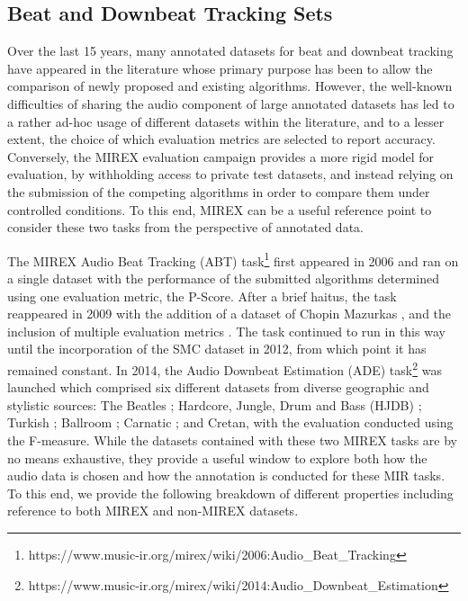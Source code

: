 \subsection{Beat and Downbeat Tracking Sets}

Over the last 15 years, many annotated datasets for beat and downbeat tracking have appeared in the literature whose primary purpose has been to allow the comparison of newly proposed and existing algorithms. However, the well-known difficulties of sharing the audio component of large annotated datasets has led to a rather ad-hoc usage of different datasets within the literature, and to a lesser extent, the choice of which evaluation metrics are selected to report accuracy. Conversely, the MIREX evaluation campaign provides a more rigid model for evaluation, by withholding access to private test datasets, and instead relying on the submission of the competing algorithms in order to compare them under controlled conditions. To this end, MIREX can be a useful reference point to consider these two tasks from the perspective of annotated data.  

The MIREX Audio Beat Tracking (ABT) task\footnote{https://www.music-ir.org/mirex/wiki/2006:Audio\_Beat\_Tracking} first appeared in 2006 and ran on a single dataset \cite{moelants04icmpc,mckinney07jnmr} with the performance of the submitted algorithms determined using one evaluation metric, the P-Score. After a brief haitus, the task reappeared in 2009 with the addition of a dataset of Chopin Mazurkas \cite{sapp07ismir}, and the inclusion of multiple evaluation metrics \cite{davies09techreport}. The task continued to run in this way until the incorporation of the SMC dataset \cite{holzapfel12taslp} in 2012, from which point it has remained constant. In 2014, the Audio Downbeat Estimation (ADE) task\footnote{https://www.music-ir.org/mirex/wiki/2014:Audio\_Downbeat\_Estimation} was launched which comprised six different datasets from diverse geographic and stylistic sources: The Beatles \cite{Mauch2009a}; Hardcore, Jungle, Drum and Bass (HJDB) \cite{hockman12ismir}; Turkish \cite{srinivasamurthy14jnmr}; Ballroom \cite{krebs13ismir}; Carnatic \cite{srinivasamurthy14icassp}; and Cretan, with the evaluation conducted using the F-measure. While the datasets contained with these two MIREX tasks are by no means exhaustive, they provide a useful window to explore both how the audio data is chosen and how the annotation is conducted for these MIR tasks. To this end, we provide the following breakdown of different properties including reference to both MIREX and non-MIREX datasets. 

